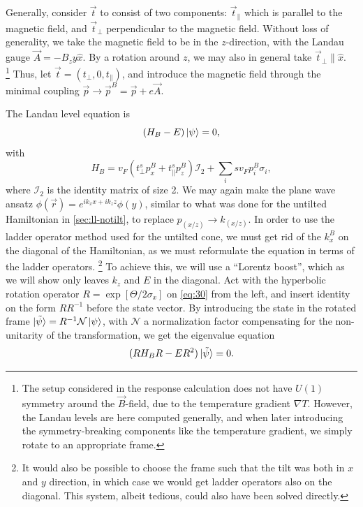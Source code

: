 Generally, consider \( \vec{t} \) to  consist of two components: \( \vec{t}_{\parallel} \) which is parallel to the magnetic field, and \( \vec{t}_{\perp} \) perpendicular to the magnetic field.
Without loss of generality, we take the magnetic field to be in the \( z \)-direction, with the Landau gauge \( \vec{A} = - B_z y \hat{x} \).
By a rotation around \( z \), we may also in general take \( \vec{t}_{\perp} \parallel \hat{x} \).~%
\footnote{
  The setup considered in the response calculation does not have \( U(1) \) symmetry around the \( \vec{B} \)-field, due to the temperature gradient \( \nabla T \).
  However, the Landau levels are here computed generally, and when later introducing the symmetry-breaking components like the temperature gradient, we simply rotate to an appropriate frame.
}
Thus, let \( \vec{t} = (t_{\perp}, 0, t_{\parallel}) \), and introduce the magnetic field through the minimal coupling \( \vec{p} \to \vec{p}^B = \vec{p} + e \vec{A} \).

The Landau level equation is
\begin{equation}
  \label{eq:30}
  \left(H_{B} - E\right) \ket{\psi } = 0,
\end{equation}
with
\begin{equation}
  \label{eq:31}
  H_{B} = v_F \left(t^s _{\perp} p^B_{x} + t^s _{\parallel} p^B_{z} \right) \mathcal{I}_2 + \sum_i s v_{F} p^B_{i} \sigma _{i},
\end{equation}
where \(\mathcal{I}_{2}\) is the identity matrix of size 2.
We may again make the plane wave ansatz \( \phi(\vec{r}) = e^{i k_x x + i k_z z} \phi(y) \), similar to what was done for the untilted Hamiltonian in \cref{sec:ll-notilt}, to replace \( p_{(x /z)} \to k_{(x /z)} \).
In order to use the ladder operator method used for the untilted cone, we must get rid of the \(k^B_{x}\) on the diagonal of the Hamiltonian, as we must reformulate the equation in terms of the ladder operators.
\footnote{It would also be possible to choose the frame such that the tilt was both in \(x\) and \(y\) direction, in which case we would get ladder operators also on the diagonal.
  This system, albeit tedious, could also have been solved directly.
}
To achieve this, we will use a ``Lorentz boost'', which as we will show only leaves \(k_{z}\) and \(E\) in the diagonal.
Act with the hyperbolic rotation operator \(R = \exp[\Theta /2 \sigma_{x}]\) on \cref{eq:30} from the left, and insert identity on the form \( R R^{-1} \) before the state vector.
By introducing the state in the rotated frame \(\ket{\tilde{\psi}} = R^{-1} \mathcal{N} \ket{\psi } \), with \(\mathcal{N}\) a normalization factor compensating for the non-unitarity of the transformation, we get the eigenvalue equation
\begin{equation}
  \label{eq:32}
  (R H_{B} R - E R^2) \ket{\tilde{\psi}} = 0.
\end{equation}


